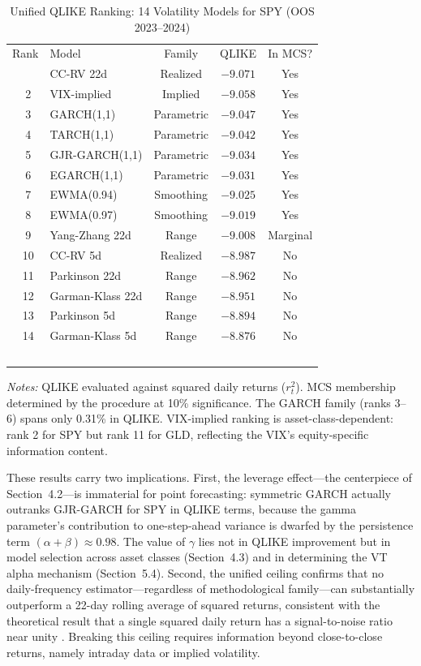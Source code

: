 \begin{table}[H]
\centering
\caption{Unified QLIKE Ranking: 14 Volatility Models for SPY (OOS 2023--2024)}
\label{tab:qlike_ceiling}
\small
\begin{tabular}{clccc}
\hline
Rank & Model & Family & QLIKE & In MCS? \\\
\hline
1 & CC-RV 22d & Realized & $-9.071$ & Yes \\\
2 & VIX-implied & Implied & $-9.058$ & Yes \\\
3 & GARCH(1,1) & Parametric & $-9.047$ & Yes \\\
4 & TARCH(1,1) & Parametric & $-9.042$ & Yes \\\
5 & GJR-GARCH(1,1) & Parametric & $-9.034$ & Yes \\\
6 & EGARCH(1,1) & Parametric & $-9.031$ & Yes \\\
7 & EWMA(0.94) & Smoothing & $-9.025$ & Yes \\\
8 & EWMA(0.97) & Smoothing & $-9.019$ & Yes \\\
9 & Yang-Zhang 22d & Range & $-9.008$ & Marginal \\\
10 & CC-RV 5d & Realized & $-8.987$ & No \\\
11 & Parkinson 22d & Range & $-8.962$ & No \\\
12 & Garman-Klass 22d & Range & $-8.951$ & No \\\
13 & Parkinson 5d & Range & $-8.894$ & No \\\
14 & Garman-Klass 5d & Range & $-8.876$ & No \\\
\hline
\end{tabular}
\begin{tablenotes}
\small
\item \textit{Notes:} QLIKE evaluated against squared daily returns ($r_t^2$). MCS membership determined by the \citet{hansen2005} procedure at 10\% significance. The GARCH family (ranks 3--6) spans only 0.31\% in QLIKE. VIX-implied ranking is asset-class-dependent: rank 2 for SPY but rank 11 for GLD, reflecting the VIX's equity-specific information content.
\end{tablenotes}
\end{table}

These results carry two implications. First, the leverage effect---the centerpiece of Section~4.2---is immaterial for point forecasting: symmetric GARCH actually outranks GJR-GARCH for SPY in QLIKE terms, because the gamma parameter's contribution to one-step-ahead variance is dwarfed by the persistence term $(\alpha + \beta) \approx 0.98$. The value of $\gamma$ lies not in QLIKE improvement but in model selection across asset classes (Section~4.3) and in determining the VT alpha mechanism (Section~5.4). Second, the unified ceiling confirms that no daily-frequency estimator---regardless of methodological family---can substantially outperform a 22-day rolling average of squared returns, consistent with the theoretical result that a single squared daily return has a signal-to-noise ratio near unity \citep{patton2011}. Breaking this ceiling requires information beyond close-to-close returns, namely intraday data or implied volatility.


